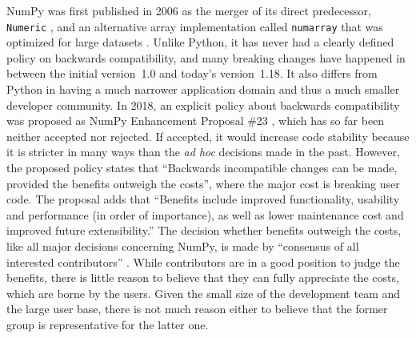 NumPy was first published in 2006 as the merger of its direct predecessor, \texttt{Numeric} \cite{DuboisNumericalPython1996}, and an alternative array implementation called \texttt{numarray} that was optimized for large datasets \cite{GreenfieldnumarrayNewScientific2003}. Unlike Python, it has never had a clearly defined policy on backwards compatibility, and many breaking changes have happened in between the initial version~1.0 and today's version~1.18. It also differs from Python in having a much narrower application domain and thus a much smaller developer community. In 2018, an explicit policy about backwards compatibility was proposed as NumPy Enhancement Proposal \#23 \cite{GommersNEP23Backwards2018},
which has so far been neither accepted nor rejected. If accepted, it would increase code stability because it is stricter in many ways than the \textit{ad hoc} decisions made in the past. However, the proposed policy states that ``Backwards incompatible changes can be made, provided the benefits outweigh the costs'', where the major cost is breaking user code. The proposal adds that ``Benefits include improved functionality, usability and performance (in order of importance), as well as lower maintenance cost and improved future extensibility.'' The decision whether benefits outweigh the costs, like all major decisions concerning NumPy, is made by ``consensus of all interested contributors'' \cite{NumPydevelopersNumPyprojectgovernance2020}.
While contributors are in a good position to judge the benefits, there is little reason to believe that they can fully appreciate the costs, which are borne by the users. Given the small size of the development team and the large user base, there is not much reason either to believe that the former group is representative for the latter one.


